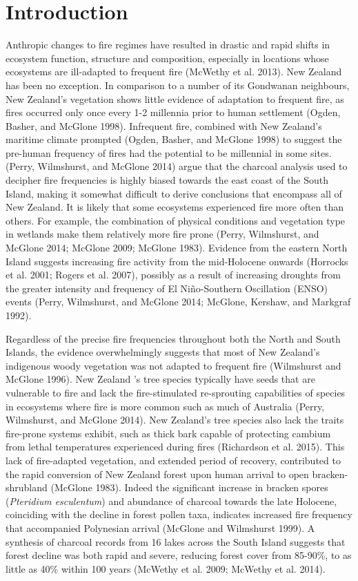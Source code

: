 \section{Introduction}\label{introduction}

Anthropic changes to fire regimes have resulted in drastic and rapid
shifts in ecosystem function, structure and composition, especially in
locations whose ecosystems are ill-adapted to frequent fire (McWethy et
al. 2013). New Zealand has been no exception. In comparison to a number
of its Gondwanan neighbours, New Zealand's vegetation shows little
evidence of adaptation to frequent fire, as fires occurred only once
every 1-2 millennia prior to human settlement (Ogden, Basher, and
McGlone 1998). Infrequent fire, combined with New Zealand's maritime
climate prompted (Ogden, Basher, and McGlone 1998) to suggest the
pre-human frequency of fires had the potential to be millennial in some
sites. (Perry, Wilmshurst, and McGlone 2014) argue that the charcoal
analysis used to decipher fire frequencies is highly biased towards the
east coast of the South Island, making it somewhat difficult to derive
conclusions that encompass all of New Zealand. It is likely that some
ecosystems experienced fire more often than others. For example, the
combination of physical conditions and vegetation type in wetlands make
them relatively more fire prone (Perry, Wilmshurst, and McGlone 2014;
McGlone 2009; McGlone 1983). Evidence from the eastern North Island
suggests increasing fire activity from the mid-Holocene onwards
(Horrocks et al. 2001; Rogers et al. 2007), possibly as a result of
increasing droughts from the greater intensity and frequency of El
Niño-Southern Oscillation (ENSO) events (Perry, Wilmshurst, and McGlone
2014; McGlone, Kershaw, and Markgraf 1992).

Regardless of the precise fire frequencies throughout both the North and
South Islands, the evidence overwhelmingly suggests that most of New
Zealand's indigenous woody vegetation was not adapted to frequent fire
(Wilmshurst and McGlone 1996). New Zealand 's tree species typically
have seeds that are vulnerable to fire and lack the fire-stimulated
re-sprouting capabilities of species in ecosystems where fire is more
common such as much of Australia (Perry, Wilmshurst, and McGlone 2014).
New Zealand's tree species also lack the traits fire-prone systems
exhibit, such as thick bark capable of protecting cambium from lethal
temperatures experienced during fires (Richardson et al. 2015). This
lack of fire-adapted vegetation, and extended period of recovery,
contributed to the rapid conversion of New Zealand forest upon human
arrival to open bracken-shrubland (McGlone 1983). Indeed the significant
increase in bracken spores (\emph{Pteridium esculentum}) and abundance
of charcoal towards the late Holocene, coinciding with the decline in
forest pollen taxa, indicates increased fire frequency that accompanied
Polynesian arrival (McGlone and Wilmshurst 1999). A synthesis of
charcoal records from 16 lakes across the South Island suggests that
forest decline was both rapid and severe, reducing forest cover from
85-90\%, to as little as 40\% within 100 years (McWethy et al. 2009;
McWethy et al. 2014).

